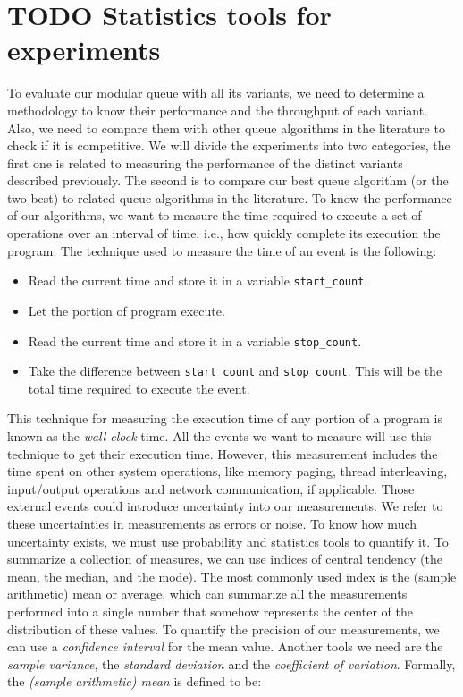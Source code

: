 \documentclass{latex/classes/thesis}
\begin{document}
\section{{\bfseries\sffamily TODO} Statistics tools for experiments}
\label{sec:org2cbf3c9}

To evaluate our modular queue with all its variants, we need to determine a
methodology to know their performance and the throughput of each
variant. Also, we need to compare them with other queue algorithms in the
literature to check if it is competitive. We will divide the experiments into
two categories, the first one is related to measuring the performance of the
distinct variants described previously. The second is to compare our best
queue algorithm (or the two best) to related queue algorithms in the
literature. To know the performance of our algorithms, we want to measure the
time required to execute a set of operations over an interval of time, i.e.,
how quickly complete its execution the program. The technique used to measure
the time of an event is the following:

\begin{itemize}
\item Read the current time and store it in a variable \texttt{start\_count}.
\item Let the portion of program execute.
\item Read the current time and store it in a variable \texttt{stop\_count}.
\item Take the difference between \texttt{start\_count} and \texttt{stop\_count}. This will be the
total time required to execute the event.
\end{itemize}

This technique for measuring the execution time of any portion of a program
is known as the \emph{wall clock} time\cite{lilja2005measuring}. All the events we
want to measure will use this technique to get their execution time.
However, this measurement includes the time spent on other system operations,
like memory paging, thread interleaving, input/output operations and network
communication, if applicable. Those external events could introduce
uncertainty into our measurements. We refer to these uncertainties in
measurements as errors or noise. To know how much uncertainty exists, we must
use probability and statistics tools to quantify it. To summarize a
collection of measures, we can use indices of central tendency (the mean, the
median, and the mode). The most commonly used index is the (sample
arithmetic) mean or average, which can summarize all the measurements
performed into a single number that somehow represents the center of the
distribution of these values. To quantify the precision of our measurements,
we can use a \emph{confidence interval} for the mean
value\cite{lilja2005measuring,DBLP_conf_oopsla_GeorgesBE07}. Another tools we
need are the \emph{sample variance}, the \emph{standard deviation} and the \emph{coefficient of
variation}. Formally, the \emph{(sample arithmetic) mean} is defined to be:
\end{document}
